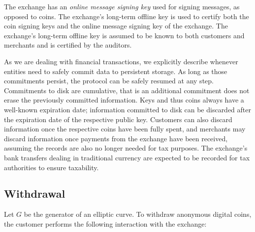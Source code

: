\documentclass{llncs}
\begin{document}
The exchange has an {\em online message signing key} used for signing
messages, as opposed to coins.  The exchange's long-term offline key is used
to certify both the coin signing keys and the online message signing key
of the exchange.  The exchange's long-term offline key is assumed to be known to
both customers and merchants and is certified by the auditors.

As we are dealing with financial transactions, we explicitly describe
whenever entities need to safely commit data to persistent storage.
As long as those commitments persist, the protocol can be safely
resumed at any step.  Commitments to disk are cumulative, that is an
additional commitment does not erase the previously committed
information.  Keys and thus coins always have a well-known expiration
date; information committed to disk can be discarded after the
expiration date of the respective public key.  Customers can also
discard information once the respective coins have been fully spent,
and merchants may discard information once payments from the exchange have
been received, assuming the records are also no longer needed for tax
purposes.  The exchange's bank transfers dealing in traditional currency
are expected to be recorded for tax authorities to ensure taxability.

\subsection{Withdrawal}

Let $G$ be the generator of an elliptic curve.  To withdraw anonymous
digital coins, the customer performs the following interaction with
the exchange:
\end{document}
